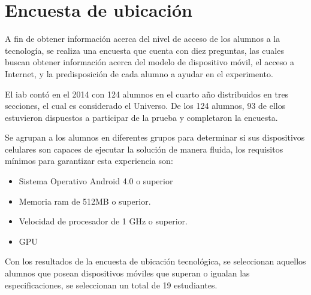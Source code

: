 \section{Encuesta de ubicación}
\label{sec:ubicacion}

A fin de obtener información acerca del nivel de acceso  de los alumnos a la
tecnología, se realiza una encuesta que cuenta con diez preguntas, las cuales
buscan obtener información acerca del modelo de dispositivo móvil, el acceso a
Internet, y la predisposición de cada alumno a ayudar en el experimento.

El \Gls{iab} contó en
el 2014 con 124 alumnos en el cuarto año distribuidos en tres secciones, el cual es considerado
el Universo. De los 124 alumnos, 93 de ellos estuvieron dispuestos a participar de la prueba
y completaron la encuesta.

Se agrupan a los alumnos en diferentes grupos para determinar si sus
dispositivos celulares son capaces de ejecutar la solución de manera fluida, los
requisitos mínimos para garantizar esta experiencia son:

\begin{itemize}
    \item Sistema Operativo Android 4.0 o superior
    \item Memoria ram de 512MB o superior.
    \item Velocidad de procesador de 1 GHz o superior.
    \item GPU 
\end{itemize}

Con los resultados de la encuesta de ubicación tecnológica, se seleccionan
aquellos alumnos que posean dispositivos móviles que superan o igualan las
especificaciones, se seleccionan un total de 19 estudiantes.

